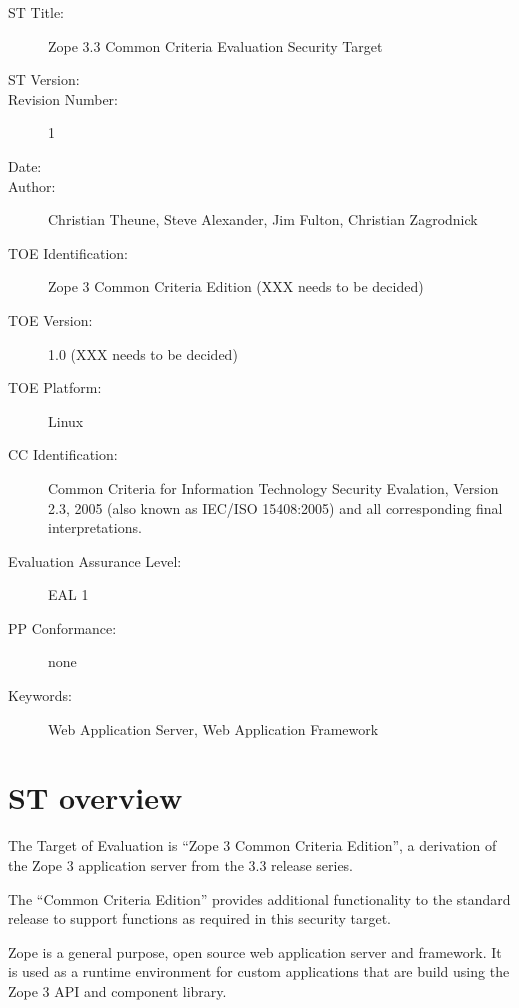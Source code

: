 \documentclass[12pt,english]{scrbook}
\begin{document}
\begin{description}

  \item[ST Title:] Zope 3.3 Common Criteria Evaluation Security Target

  \item[ST Version:] \svnInfoRevision

  \item[Revision Number:] 1

  \item[Date:] \svnInfoDate

  \item[Author:] Christian Theune, Steve Alexander, Jim Fulton, Christian Zagrodnick

  \item[TOE Identification:] Zope 3 Common Criteria Edition (XXX needs to be decided)

  \item[TOE Version:] 1.0 (XXX needs to be decided)

  \item[TOE Platform:] Linux

  \item[CC Identification:] Common Criteria for Information Technology Security
  Evalation, Version 2.3, 2005 (also known as IEC/ISO 15408:2005) and all
  corresponding final interpretations.

  \item[Evaluation Assurance Level:] EAL 1

  \item[PP Conformance:] none

  \item[Keywords:] Web Application Server, Web Application Framework
\end{description}


\section{ST overview}

The Target of Evaluation is ``Zope 3 Common Criteria Edition'', a derivation
of the Zope 3 application server from the 3.3 release series.

The ``Common Criteria Edition'' provides additional functionality to the
standard release to support functions as required in this security target.

Zope is a general purpose, open source web application server and framework.
It is used as a runtime environment for custom applications that are build
using the Zope 3 API and component library.
\end{document}
